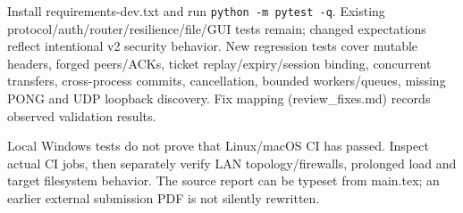 \documentclass[11pt,a4paper]{article}
\begin{document}
Install requirements-dev.txt and run \texttt{python -m pytest -q}. Existing protocol/auth/router/resilience/file/GUI tests remain; changed expectations reflect intentional v2 security behavior. New regression tests cover mutable headers, forged peers/ACKs, ticket replay/expiry/session binding, concurrent transfers, cross-process commits, cancellation, bounded workers/queues, missing PONG and UDP loopback discovery. Fix mapping (review\_fixes.md) records observed validation results.

Local Windows tests do not prove that Linux/macOS CI has passed. Inspect actual CI jobs, then separately verify LAN topology/firewalls, prolonged load and target filesystem behavior. The source report can be typeset from main.tex; an earlier external submission PDF is not silently rewritten.
\end{document}
